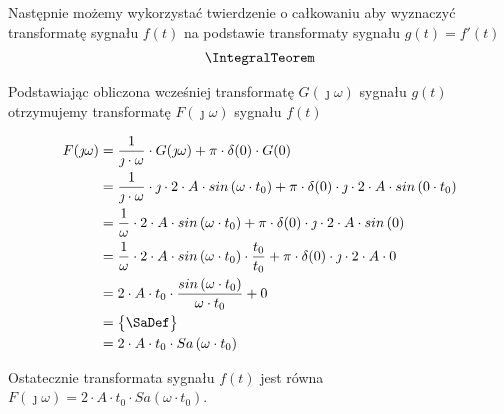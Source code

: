 \begin{task}
Następnie możemy wykorzystać twierdzenie o całkowaniu aby wyznaczyć transformatę sygnału $f(t)$ na podstawie transformaty sygnału $g(t)=f'(t)$
\begin{align*}
\IntegralTeorem
\end{align*}

Podstawiając obliczona wcześniej transformatę $G(\jmath \omega)$ sygnału $g(t)$ otrzymujemy transformatę $F(\jmath \omega)$ sygnału $f(t)$

\begin{align*}
F(\jmath \omega) &= \frac{1}{\jmath \cdot \omega} \cdot G(\jmath \omega) + \pi \cdot \delta(0) \cdot G(0)\\
&=\frac{1}{\jmath \cdot \omega} \cdot \jmath \cdot 2 \cdot A \cdot sin\left( \omega \cdot t_0\right) + \pi \cdot \delta(0) \cdot \jmath \cdot 2 \cdot A \cdot sin\left( 0 \cdot t_0\right)\\
&=\frac{1}{\omega} \cdot 2 \cdot A \cdot sin\left( \omega \cdot t_0\right) + \pi \cdot \delta(0) \cdot \jmath \cdot 2 \cdot A \cdot sin\left( 0\right)\\
&=\frac{1}{\omega} \cdot 2 \cdot A \cdot sin\left( \omega \cdot t_0\right) \cdot \frac{t_0}{t_0} + \pi \cdot \delta(0) \cdot \jmath \cdot 2 \cdot A \cdot 0\\
&= 2 \cdot A \cdot t_0 \cdot \frac{sin\left( \omega \cdot t_0\right)}{\omega \cdot t_0} + 0\\
&=\begin{Bmatrix}
\SaDef
\end{Bmatrix}\\
&= 2 \cdot A \cdot t_0 \cdot Sa\left( \omega \cdot t_0\right)\\
\end{align*}

Ostatecznie transformata sygnału $f(t)$ jest równa $F(\jmath \omega)=2 \cdot A \cdot t_0 \cdot Sa\left( \omega \cdot t_0\right)$.
\end{task}

